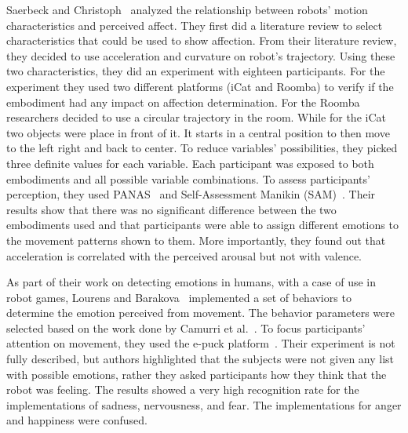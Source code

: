 Saerbeck and Christoph~\cite{Saerbeck2010} analyzed the relationship between robots' motion characteristics and perceived affect. They first did a literature review to select characteristics that could be used to show affection. From their literature review, they decided to use acceleration and curvature on robot's trajectory. 
Using these two characteristics, they did an experiment with eighteen participants. For the experiment they used two different platforms (iCat and Roomba) to verify if the embodiment had any impact on affection determination. For the Roomba researchers decided to use a circular trajectory in the room. While for the iCat two objects were place in front of it. It starts in a central position to then move to the left  right and back to center. 
To reduce variables' possibilities, they picked three definite values for each variable. Each participant was exposed to both embodiments and all possible variable combinations. To assess participants' perception, they used PANAS~\cite{WatsonClarkTellegen88} and Self-Assessment Manikin (SAM)~\cite{Lang2008}. Their results show that there was no significant difference between the two embodiments used and that participants were able to assign different emotions to the movement patterns shown to them. 
More importantly, they found out that acceleration is correlated with the perceived arousal but not with valence. 

As part of their work on detecting emotions in humans, with a case of use in robot games, Lourens and Barakova~\cite{BarakovaL10} implemented a set of behaviors to determine the emotion  perceived from movement. The behavior parameters were selected based on the work done by Camurri et al.~\cite{pop00002}. To focus participants' attention on movement, they used the e-puck platform~\cite{Mondada09thee-puck}. 
Their experiment is not fully described, but authors highlighted that the subjects were not given any list with possible emotions, rather they asked participants how they think that the robot was feeling. The results showed a very high recognition rate for the implementations of sadness, nervousness, and fear. The implementations for anger and happiness were confused. 

